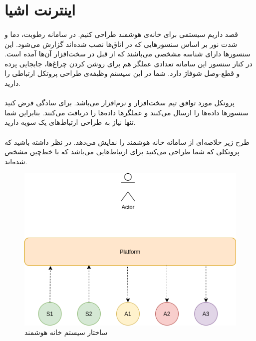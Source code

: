 \documentclass[../main.tex]{subfiles}
\begin{document}
\section{اینترنت اشیا}

\paragraph{}
قصد داریم سیستمی برای خانه‌ی هوشمند طراحی کنیم.
در سامانه رطوبت، دما و شدت نور بر اساس سنسورهایی که در اتاق‌ها نصب شده‌اند گزارش می‌شود.
این سنسورها دارای شناسه مشخصی می‌باشند که از قبل در سخت‌افزار آن‌ها آمده است.
در کنار سنسور این سامانه تعدادی عملگر هم برای روشن کردن چراغ‌ها، جابجایی پرده و قطع-وصل شوفاژ دارد.
شما در این سیستم وظیفه‌ی طراحی پروتکل ارتباطی را دارید.

\paragraph{}
پروتکل مورد توافق تیم سخت‌افزار و نرم‌افزار  می‌باشد. برای سادگی فرض کنید سنسورها داده‌ها را ارسال می‌کنند و عملگرها داده‌ها را دریافت می‌کنند.
بنابراین شما تنها نیاز به طراحی ارتباط‌های یک سویه دارید.

\paragraph{}
طرح زیر خلاصه‌ای از سامانه خانه هوشمند را نمایش می‌دهد. در نظر داشته باشید که پروتکلی که
شما طراحی می‌کنید برای ارتباط‌هایی می‌باشد که با خط‌چین مشخص شده‌اند.

\begin{figure}[h!]
  \centering
  \includegraphics[scale=0.2]{json.png}
  \caption{ساختار سیستم خانه هوشمند}
\end{figure}
\end{document}
